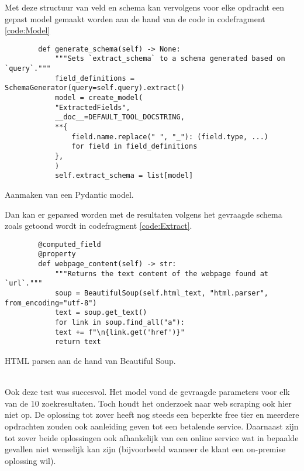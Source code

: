 Met deze structuur van veld en schema kan vervolgens voor elke opdracht een gepast model gemaakt worden aan de hand van de code in codefragment \ref{code:Model}
\begin{listing}[h!]
    \begin{verbatim}
        def generate_schema(self) -> None:
            """Sets `extract_schema` to a schema generated based on `query`."""
            field_definitions = SchemaGenerator(query=self.query).extract()
            model = create_model(
            "ExtractedFields",
            __doc__=DEFAULT_TOOL_DOCSTRING,
            **{
                field.name.replace(" ", "_"): (field.type, ...)
                for field in field_definitions
            },
            )
            self.extract_schema = list[model]
    \end{verbatim}
    \caption[Pydantic model]{Aanmaken van een Pydantic model.}
    \label{code:Model}
\end{listing}
Dan kan er geparsed worden met de resultaten volgens het gevraagde schema zoals getoond wordt in codefragment \ref{code:Extract}.
\begin{listing}[h!]
    \begin{verbatim}
        @computed_field
        @property
        def webpage_content(self) -> str:
            """Returns the text content of the webpage found at `url`."""
            soup = BeautifulSoup(self.html_text, "html.parser", from_encoding="utf-8")
            text = soup.get_text()
            for link in soup.find_all("a"):
            text += f"\n{link.get('href')}"
            return text
    \end{verbatim}
    \caption[Beatiful Soup HTML parser]{HTML parsen aan de hand van Beautiful Soup.}
    \label{code:Extract}
\end{listing}
\\
Ook deze test was succesvol. Het model vond de gevraagde parameters voor elk van de 10 zoekresultaten. Toch houdt het onderzoek naar web scraping ook hier niet op. De oplossing tot zover heeft nog steeds een beperkte free tier en meerdere opdrachten zouden ook aanleiding geven tot een betalende service.
Daarnaast zijn tot zover beide oplossingen ook afhankelijk van een online service wat in bepaalde gevallen niet wenselijk kan zijn (bijvoorbeeld wanneer de klant een on-premise oplossing wil).
